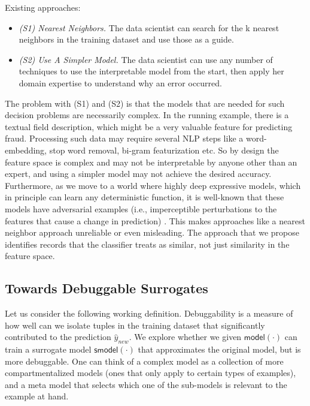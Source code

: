 Existing approaches: 
\begin{itemize}
\item \emph{(S1) Nearest Neighbors. } The data scientist can search for the k nearest neighbors in the training dataset and use those as a guide.

\item \emph{(S2) Use A Simpler Model.} The data scientist can use any number of techniques to use the interpretable model from the start, then apply her domain expertise to understand why an error occurred.
\end{itemize}

The problem with (S1) and (S2) is that the models that are needed for such decision problems are necessarily complex. In the running example, there is a textual field \textsf{description}, which might be a very valuable feature for predicting fraud. Processing such data may require several NLP steps like a word-embedding, stop word removal, bi-gram featurization etc. So by design the feature space is complex and may not be interpretable by anyone other than an expert, and using a simpler model may not achieve the desired accuracy. Furthermore, as we move to a world where highly deep expressive models, which in principle can learn any deterministic function, it is well-known that these models have adversarial examples (i.e., imperceptible perturbations to the features that cause a change in prediction) \cite{szegedy2013intriguing}. This makes approaches like a nearest neighbor approach unreliable or even misleading. The approach that we propose identifies records that the classifier treats as similar, not just similarity in the feature space.

\subsection{Towards Debuggable Surrogates}
Let us consider the following working definition.
Debuggability is a measure of how well can we isolate tuples in the training dataset that significantly contributed to the prediction $ \hat{y}_{new}$.
We explore whether we given $\textsf{model}(\cdot)$ can train a surrogate model $\textsf{smodel}(\cdot)$ that approximates the original model, but is more debuggable.
One can think of a complex model as a collection of more compartmentalized models (ones that only apply to certain types of examples), and a meta model that selects which one of the sub-models is relevant to the example at hand.

